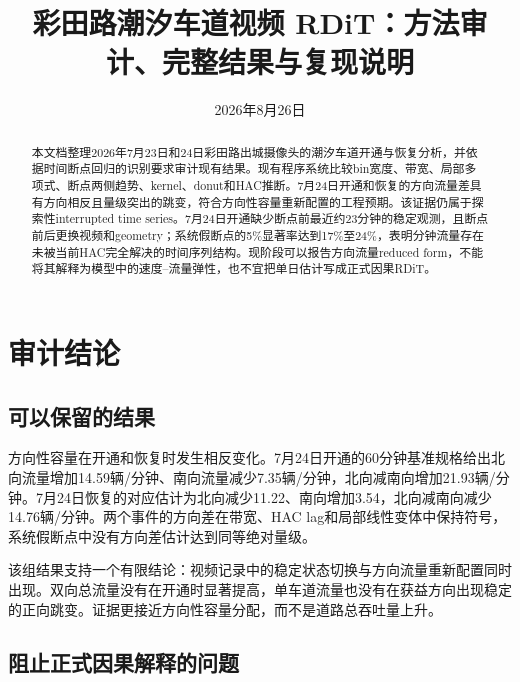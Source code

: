 \documentclass[11pt,a4paper]{ctexart}
\title{彩田路潮汐车道视频 RDiT：方法审计、完整结果与复现说明}
\author{}
\date{2026年8月26日}
\begin{document}
\maketitle

\begin{abstract}
本文档整理2026年7月23日和24日彩田路出城摄像头的潮汐车道开通与恢复分析，并依据时间断点回归的识别要求审计现有结果。现有程序系统比较bin宽度、带宽、局部多项式、断点两侧趋势、kernel、donut和HAC推断。7月24日开通和恢复的方向流量差具有方向相反且量级突出的跳变，符合方向性容量重新配置的工程预期。该证据仍属于探索性interrupted time series。7月24日开通缺少断点前最近约23分钟的稳定观测，且断点前后更换视频和geometry；系统假断点的5\%显著率达到17\%至24\%，表明分钟流量存在未被当前HAC完全解决的时间序列结构。现阶段可以报告方向流量reduced form，不能将其解释为模型中的速度--流量弹性，也不宜把单日估计写成正式因果RDiT。
\end{abstract}

\tableofcontents
\clearpage

\section{审计结论}

\subsection{可以保留的结果}

方向性容量在开通和恢复时发生相反变化。7月24日开通的60分钟基准规格给出北向流量增加14.59辆/分钟、南向流量减少7.35辆/分钟，北向减南向增加21.93辆/分钟。7月24日恢复的对应估计为北向减少11.22、南向增加3.54，北向减南向减少14.76辆/分钟。两个事件的方向差在带宽、HAC lag和局部线性变体中保持符号，系统假断点中没有方向差估计达到同等绝对量级。

该组结果支持一个有限结论：视频记录中的稳定状态切换与方向流量重新配置同时出现。双向总流量没有在开通时显著提高，单车道流量也没有在获益方向出现稳定的正向跳变。证据更接近方向性容量分配，而不是道路总吞吐量上升。

\subsection{阻止正式因果解释的问题}
\end{document}
